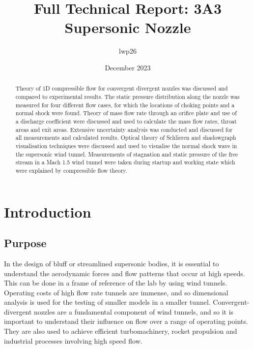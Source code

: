 \documentclass{article}
\begin{document}

\title{Full Technical Report: 3A3 Supersonic Nozzle}
\author{lwp26}
\date{December 2023}
\maketitle

\begin{abstract}
    \centering
    Theory of 1D compressible flow for convergent divergent nozzles was discussed and compared to experimental results.
    The static pressure distribution along the nozzle was measured for four different flow cases, for which the locations of choking points and a normal shock were found.
    Theory of mass flow rate through an orifice plate and use of a discharge coefficient were discussed and used to calculate the mass flow rates, throat areas and exit areas.
    Extensive uncertainty analysis was conducted and discussed for all measurements and calculated results.
    Optical theory of Schlieren and shadowgraph visualisation techniques were discussed and used to visualise the normal shock wave in the supersonic wind tunnel.
    Measurements of stagnation and static pressure of the free stream in a Mach 1.5 wind tunnel were taken during startup and working state which were explained by compressible flow theory.
\end{abstract}

\newpage

\section{Introduction}

\subsection{Purpose}
In the design of bluff or streamlined supersonic bodies, it is essential to understand the aerodynamic forces and flow patterns that occur at high speeds.
This can be done in a frame of reference of the lab by using wind tunnels.
Operating costs of high flow rate tunnels are immense, and so dimensional analysis is used for the testing of smaller models in a smaller tunnel.
Convergent-divergent nozzles are a fundamental component of wind tunnels, and so it is important to understand their influence on flow over a range of operating points.
They are also used to achieve efficient turbomachinery, rocket propulsion and industrial processes involving high speed flow.
\end{document}
